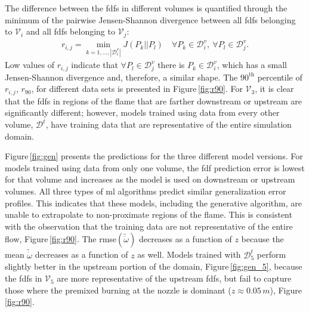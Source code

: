 \documentclass[review]{elsarticle}
\newcommand{\wt}[1]{\widetilde{#1}}
\begin{document}
The difference between the \glspl{fdf} in different volumes is quantified
through the minimum of the pairwise Jensen-Shannon divergence between
all \glspl{fdf} belonging to $\mathcal{V}_i$ and all \glspl{fdf} belonging to
$\mathcal{V}_j$:
\begin{align}
  \label{eq:distance}
  r_{i,j} = \min_{k=1,\dots, |\mathcal{D}_i^v|} J( P_k || P_l )\quad \forall P_k \in \mathcal{D}_i^v,\ \forall P_l \in \mathcal{D}_j^v.
\end{align}
Low values of $r_{i,j}$ indicate that
$\forall P_l \in \mathcal{D}_j^v$ there is $P_k \in \mathcal{D}_i^v$,
which has a small Jensen-Shannon divergence and, therefore, a similar
shape. The $90^{\text{th}}$ percentile of $r_{i,j}$, $r_{90}$, for
different data sets is presented in Figure\,\ref{fig:r90}. For
$\mathcal{V}_3$, it is clear that the \glspl{fdf} in regions of the flame
that are farther downstream or upstream are significantly
different; however, models trained using data from every other volume,
$\mathcal{D}^t$, have training data that are representative of the
entire simulation domain.

Figure\,\ref{fig:gen} presents the predictions for the three different
model versions. For models trained using data from only one volume,
the \gls{fdf} prediction error is lowest for that volume and increases as
the model is used on downstream or upstream volumes.  All three types
of \gls{ml} algorithms predict similar generalization error
profiles. This indicates that these models, including the generative
algorithm, are unable to extrapolate to non-proximate regions of the
flame. This is consistent with the observation that the training data
are not representative of the entire flow, Figure\,\ref{fig:r90}. The
\gls{rmse}$(\wt{\dot{\omega}})$ decreases as a function of $z$ because the
mean $\wt{\dot{\omega}}$ decreases as a function of $z$ as
well. Models trained with $\mathcal{D}_5^t$ perform slightly better in
the upstream portion of the domain, Figure\,\ref{fig:gen_5}, because
the \glspl{fdf} in $\mathcal{V}_5$ are more representative of the upstream
\glspl{fdf}, but fail to capture those where the premixed burning at the
nozzle is dominant ($z\approx 0.05\,\unit{m}$), Figure\,\ref{fig:r90}.
\end{document}
